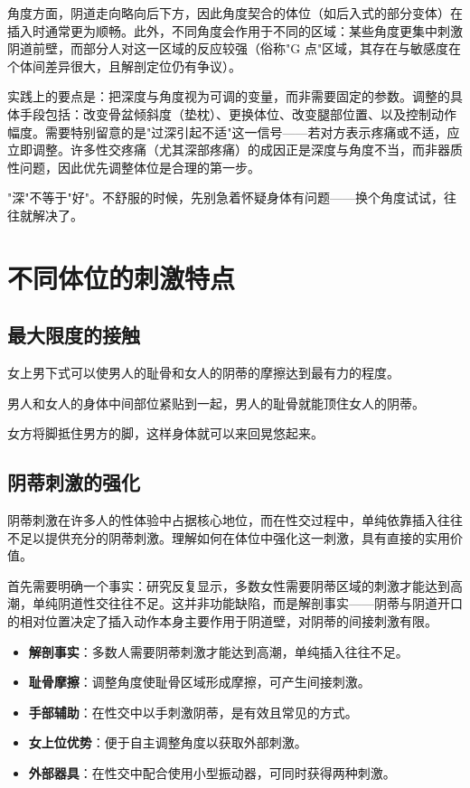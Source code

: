 \documentclass[12pt,UTF8]{ctexbook}
\newcommand{\keyword}[1]{\textbf{#1}}
\begin{document}
角度方面，阴道走向略向后下方，因此角度契合的体位（如后入式的部分变体）在插入时通常更为顺畅。此外，不同角度会作用于不同的区域：某些角度更集中刺激阴道前壁，而部分人对这一区域的反应较强（俗称"G 点"区域，其存在与敏感度在个体间差异很大，且解剖定位仍有争议）。

实践上的要点是：把深度与角度视为可调的变量，而非需要固定的参数。调整的具体手段包括：改变骨盆倾斜度（垫枕）、更换体位、改变腿部位置、以及控制动作幅度。需要特别留意的是"过深引起不适"这一信号——若对方表示疼痛或不适，应立即调整。许多性交疼痛（尤其深部疼痛）的成因正是深度与角度不当，而非器质性问题，因此优先调整体位是合理的第一步。

\begin{tcolorbox}[colback=pink!5!white,colframe=red!50!black,title=贴心小叮咛]
"深"不等于"好"。不舒服的时候，先别急着怀疑身体有问题——换个角度试试，往往就解决了。
\end{tcolorbox}

\section{不同体位的刺激特点}

\vspace{0.5em}
\subsection{最大限度的接触}

女上男下式可以使男人的耻骨和女人的阴蒂的摩擦达到最有力的程度。

男人和女人的身体中间部位紧贴到一起，男人的耻骨就能顶住女人的阴蒂。

女方将脚抵住男方的脚，这样身体就可以来回晃悠起来。


\subsection{阴蒂刺激的强化}

阴蒂刺激在许多人的性体验中占据核心地位，而在性交过程中，单纯依靠插入往往不足以提供充分的阴蒂刺激。理解如何在体位中强化这一刺激，具有直接的实用价值。

首先需要明确一个事实：研究反复显示，多数女性需要阴蒂区域的刺激才能达到高潮，单纯阴道性交往往不足。这并非功能缺陷，而是解剖事实——阴蒂与阴道开口的相对位置决定了插入动作本身主要作用于阴道壁，对阴蒂的间接刺激有限。

\begin{itemize}
  \item \keyword{解剖事实}：多数人需要阴蒂刺激才能达到高潮，单纯插入往往不足。
  \item \keyword{耻骨摩擦}：调整角度使耻骨区域形成摩擦，可产生间接刺激。
  \item \keyword{手部辅助}：在性交中以手刺激阴蒂，是有效且常见的方式。
  \item \keyword{女上位优势}：便于自主调整角度以获取外部刺激。
  \item \keyword{外部器具}：在性交中配合使用小型振动器，可同时获得两种刺激。
\end{itemize}
\end{document}
